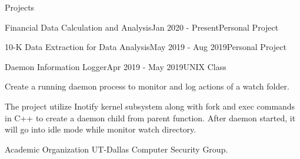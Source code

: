 \documentclass{resume} %
\begin{document}
\begin{rSection}{Projects}
    \begin{rSubsection}{Financial Data Calculation and Analysis}{Jan 2020 - Present}{Personal Project}{}
        \item 
        \item 
    \end{rSubsection}
    
    \begin{rSubsection}{10-K Data Extraction for Data Analysis}{May 2019 - Aug 2019}{Personal Project}{}
        \item
    \end{rSubsection}
    
    \begin{rSubsection}{Daemon Information Logger}{Apr 2019 - May 2019}{UNIX Class}{}
        \item Create a running daemon process to monitor and log actions of a watch folder.
        \item The project utilize Inotify kernel subsystem along with fork and exec commands in C++ to create a daemon child from parent function. After daemon started, it will go into idle mode while monitor watch directory.
        \item 
    \end{rSubsection}
\end{rSection}


\begin{rSection}{Academic Organization} 
    UT-Dallas Computer Security Group.
\end{rSection}
\end{document}
